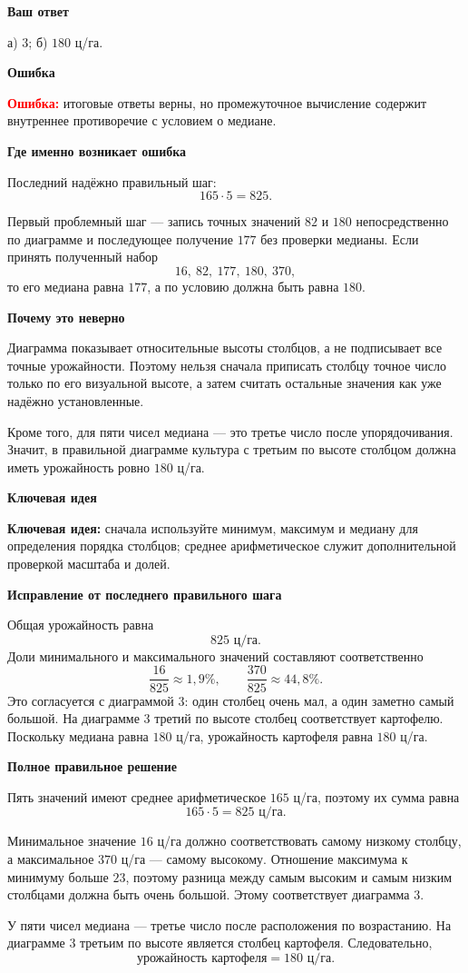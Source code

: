 \documentclass[12pt,a4paper]{article}
\newcommand{\errorlabel}{\textcolor{red}{\textbf{Ошибка:}}}
\newcommand{\keyidea}{\textcolor{blue!60!black}{\textbf{Ключевая идея:}}}
\newcommand{\subhead}[1]{\par\medskip\textbf{#1}\par}
\begin{document}
\subhead{Ваш ответ}
а) 3; б) $180$ ц/га.

\subhead{Ошибка}
\errorlabel{} итоговые ответы верны, но промежуточное вычисление содержит внутреннее противоречие с условием о медиане.

\subhead{Где именно возникает ошибка}
Последний надёжно правильный шаг:
\[
165\cdot5=825.
\]

Первый проблемный шаг --- запись точных значений $82$ и $180$ непосредственно по диаграмме и последующее получение $177$ без проверки медианы. Если принять полученный набор
\[
16,\ 82,\ 177,\ 180,\ 370,
\]
то его медиана равна $177$, а по условию должна быть равна $180$.

\subhead{Почему это неверно}
Диаграмма показывает относительные высоты столбцов, а не подписывает все точные урожайности. Поэтому нельзя сначала приписать столбцу точное число только по его визуальной высоте, а затем считать остальные значения как уже надёжно установленные.

Кроме того, для пяти чисел медиана --- это третье число после упорядочивания. Значит, в правильной диаграмме культура с третьим по высоте столбцом должна иметь урожайность ровно $180$ ц/га.

\subhead{Ключевая идея}
\keyidea{} сначала используйте минимум, максимум и медиану для определения порядка столбцов; среднее арифметическое служит дополнительной проверкой масштаба и долей.

\subhead{Исправление от последнего правильного шага}
Общая урожайность равна
\[
825\text{ ц/га}.
\]
Доли минимального и максимального значений составляют соответственно
\[
\frac{16}{825}\approx1{,}9\%,\qquad \frac{370}{825}\approx44{,}8\%.
\]
Это согласуется с диаграммой 3: один столбец очень мал, а один заметно самый большой. На диаграмме 3 третий по высоте столбец соответствует картофелю. Поскольку медиана равна $180$ ц/га, урожайность картофеля равна $180$ ц/га.

\subhead{Полное правильное решение}
Пять значений имеют среднее арифметическое $165$ ц/га, поэтому их сумма равна
\[
165\cdot5=825\text{ ц/га}.
\]

Минимальное значение $16$ ц/га должно соответствовать самому низкому столбцу, а максимальное $370$ ц/га --- самому высокому. Отношение максимума к минимуму больше $23$, поэтому разница между самым высоким и самым низким столбцами должна быть очень большой. Этому соответствует диаграмма 3.

У пяти чисел медиана --- третье число после расположения по возрастанию. На диаграмме 3 третьим по высоте является столбец картофеля. Следовательно,
\[
\text{урожайность картофеля}=180\text{ ц/га}.
\]
\end{document}
